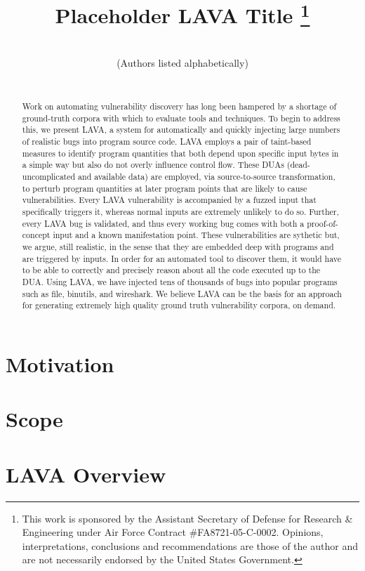\documentclass[conference]{IEEEtran}
\title{Placeholder LAVA Title
  \thanks{This work is sponsored by the Assistant Secretary of Defense
    for Research \& Engineering under Air Force Contract
    \#FA8721-05-C-0002.  Opinions, interpretations, conclusions and
    recommendations are those of the author and are not necessarily
    endorsed by the United States Government.} }
\author{
\IEEEauthorblockN{Brendan Dolan-Gavitt\IEEEauthorrefmark{1}, Patrick Hulin\IEEEauthorrefmark{2}, Tim Leek\IEEEauthorrefmark{2}, Ryan Whelan\IEEEauthorrefmark{2}}
\\
\small (Authors listed alphabetically) \\
\\
\IEEEauthorblockA{\IEEEauthorrefmark{1}NYU\\brendandg@nyu.edu}
\IEEEauthorblockA{\IEEEauthorrefmark{2}MIT Lincoln Laboratory\\
\{patrick.hulin,tleek,rwhelan\}@ll.mit.edu}
}
\begin{document}
\maketitle

\begin{abstract}

Work on automating vulnerability discovery has long been hampered by a shortage of ground-truth corpora with which to evaluate tools and techniques.
To begin to address this, we present LAVA, a system for automatically and quickly injecting large numbers of realistic bugs into program source code.  
LAVA employs a pair of taint-based measures to identify program quantities that both depend upon specific input bytes in a simple way but also do not overly influence control flow.
These DUAs (dead-uncomplicated and available data) are employed, via source-to-source transformation, to perturb program quantities at later program points that are likely to cause vulnerabilities.
Every LAVA vulnerability is accompanied by a fuzzed input that specifically triggers it, whereas normal inputs are extremely unlikely to do so.
Further, every LAVA bug is validated, and thus every working bug comes with both a proof-of-concept input and a known manifestation point.  
These vulnerabilities are sythetic but, we argue, still realistic, in the sense that they are embedded deep with programs and are triggered by inputs.
In order for an automated tool to discover them, it would have to be able to correctly and precisely reason about all the code executed up to the DUA.
Using LAVA, we have injected tens of thousands of bugs into popular programs such as file, binutils, and wireshark.
We believe LAVA can be the basis for an approach for generating extremely high quality ground truth vulnerability corpora, on demand.



\end{abstract}

\section{Motivation}
\label{sec:motivation}


\section{Scope}
\label{sec:scope}


\section{LAVA Overview}
\label{sec:overview}

\end{document}
